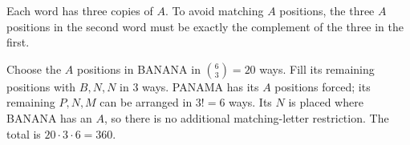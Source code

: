 Each word has three copies of $A$. To avoid matching $A$ positions, the three $A$ positions in the second word must be exactly the complement of the three in the first.

Choose the $A$ positions in BANANA in $\binom63=20$ ways. Fill its remaining positions with $B,N,N$ in $3$ ways. PANAMA has its $A$ positions forced; its remaining $P,N,M$ can be arranged in $3!=6$ ways. Its $N$ is placed where BANANA has an $A$, so there is no additional matching-letter restriction. The total is $\boxed{20\cdot3\cdot6=360}$.
